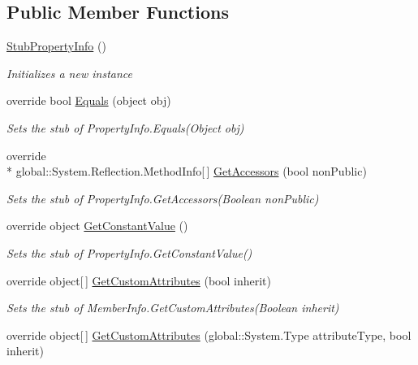 \subsection*{Public Member Functions}
\begin{DoxyCompactItemize}
\item 
\hyperlink{class_system_1_1_reflection_1_1_fakes_1_1_stub_property_info_ac5906aa87f99a2a4dbacc1b79f38ce62}{Stub\-Property\-Info} ()
\begin{DoxyCompactList}\small\item\em Initializes a new instance\end{DoxyCompactList}\item 
override bool \hyperlink{class_system_1_1_reflection_1_1_fakes_1_1_stub_property_info_ad13c0cb07b8d008de770cd6dbc684eab}{Equals} (object obj)
\begin{DoxyCompactList}\small\item\em Sets the stub of Property\-Info.\-Equals(\-Object obj)\end{DoxyCompactList}\item 
override \\*
global\-::\-System.\-Reflection.\-Method\-Info\mbox{[}$\,$\mbox{]} \hyperlink{class_system_1_1_reflection_1_1_fakes_1_1_stub_property_info_aec9ba6f6e82f716d21b15b91abb0dd19}{Get\-Accessors} (bool non\-Public)
\begin{DoxyCompactList}\small\item\em Sets the stub of Property\-Info.\-Get\-Accessors(\-Boolean non\-Public)\end{DoxyCompactList}\item 
override object \hyperlink{class_system_1_1_reflection_1_1_fakes_1_1_stub_property_info_aef50277d54d3482455b470d531b6d9f2}{Get\-Constant\-Value} ()
\begin{DoxyCompactList}\small\item\em Sets the stub of Property\-Info.\-Get\-Constant\-Value()\end{DoxyCompactList}\item 
override object\mbox{[}$\,$\mbox{]} \hyperlink{class_system_1_1_reflection_1_1_fakes_1_1_stub_property_info_a1b73cfe4b8503a180426c4babc72cdfe}{Get\-Custom\-Attributes} (bool inherit)
\begin{DoxyCompactList}\small\item\em Sets the stub of Member\-Info.\-Get\-Custom\-Attributes(\-Boolean inherit)\end{DoxyCompactList}\item 
override object\mbox{[}$\,$\mbox{]} \hyperlink{class_system_1_1_reflection_1_1_fakes_1_1_stub_property_info_acbdc33fe9342c44a0e3d57bec9786de8}{Get\-Custom\-Attributes} (global\-::\-System.\-Type attribute\-Type, bool inherit)

\end{DoxyCompactItemize}
